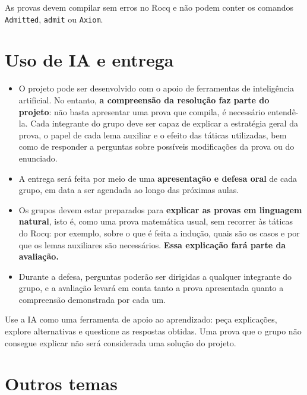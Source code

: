 \documentclass[11pt,a4paper]{article}
\newcommand{\rocq}{\textsf{Rocq}}
\begin{document}
\begin{atencao}
  As provas devem compilar sem erros no \rocq{} e não podem conter
  os comandos \texttt{Admitted}, \texttt{admit} ou \texttt{Axiom}.
\end{atencao}

\section{Uso de IA e entrega}

\begin{itemize}[leftmargin=*]
\item O projeto pode ser desenvolvido com o apoio de ferramentas de
  inteligência artificial. No entanto, \textbf{a compreensão da resolução faz
    parte do projeto}: não basta apresentar uma prova que compila, é
  necessário entendê-la. Cada integrante do grupo deve ser capaz de
  explicar a estratégia geral da prova, o papel de cada lema auxiliar e o
  efeito das táticas utilizadas, bem como de responder a perguntas sobre
  possíveis modificações da prova ou do enunciado.
\item A entrega será feita por meio de uma \textbf{apresentação e defesa
    oral} de cada grupo, em data a ser agendada ao longo das próximas aulas.
\item Os grupos devem estar preparados para \textbf{explicar as provas em
    linguagem natural}, isto é, como uma prova matemática usual, sem
  recorrer às táticas do \rocq: por exemplo, sobre o que é feita a indução,
  quais são os casos e por que os lemas auxiliares são necessários.
  \textbf{Essa explicação fará parte da avaliação.}
\item Durante a defesa, perguntas poderão ser dirigidas a qualquer
  integrante do grupo, e a avaliação levará em conta tanto a prova
  apresentada quanto a compreensão demonstrada por cada um.
\end{itemize}

\begin{tcolorbox}[enhanced,colback=unbblue!4,colframe=unbblue!60,
  boxrule=0.6pt,arc=2mm,left=10pt,right=10pt,fonttitle=\bfseries,
  title={\faRobot\quad Sobre o uso de IA}]
  Use a IA como uma ferramenta de apoio ao aprendizado: peça explicações,
  explore alternativas e questione as respostas obtidas. Uma prova que o grupo
  não consegue explicar não será considerada uma solução do projeto.
\end{tcolorbox}

\section{Outros temas}
\end{document}
